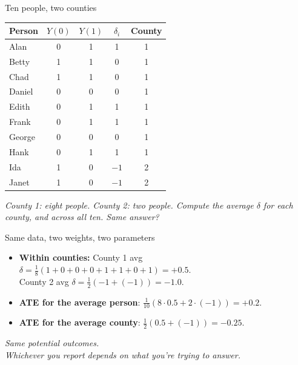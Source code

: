 \documentclass[aspectratio=169,11pt]{beamer}
\begin{document}
\begin{frame}{Ten people, two counties}
\vspace{0.1em}
\begin{center}
\footnotesize
\renewcommand{\arraystretch}{1.05}
\begin{tabular}{@{}l c c c c@{}}
\toprule
\textbf{Person} & $Y(0)$ & $Y(1)$ & $\delta_i$ & \textbf{County} \\
\midrule
\rowcolor{remixgreenlight}Alan    & 0 & 1 &  1 & 1 \\
\rowcolor{remixgreenlight}Betty   & 1 & 1 &  0 & 1 \\
\rowcolor{remixgreenlight}Chad    & 1 & 1 &  0 & 1 \\
\rowcolor{remixgreenlight}Daniel  & 0 & 0 &  0 & 1 \\
\rowcolor{remixgreenlight}Edith   & 0 & 1 &  1 & 1 \\
\rowcolor{remixgreenlight}Frank   & 0 & 1 &  1 & 1 \\
\rowcolor{remixgreenlight}George  & 0 & 0 &  0 & 1 \\
\rowcolor{remixgreenlight}Hank    & 0 & 1 &  1 & 1 \\
\midrule
\rowcolor{oceanlight}Ida   & 1 & 0 & $-1$ & 2 \\
\rowcolor{oceanlight}Janet & 1 & 0 & $-1$ & 2 \\
\bottomrule
\end{tabular}
\end{center}
\vspace{0.3em}
\begin{center}
\small\color{warmgray}\itshape
County 1: eight people. \;County 2: two people. \;Compute the average $\delta$ for each county, and across all ten. Same answer?
\end{center}
\end{frame}

\begin{frame}{Same data, two weights, two parameters}
\vspace{0.6em}
\begin{itemize}
  \item \textbf{Within counties:} County 1 avg $\delta = \tfrac{1}{8}(1{+}0{+}0{+}0{+}1{+}1{+}0{+}1) = \mathbf{+0.5}$. \\
        \hspace{1.7em} County 2 avg $\delta = \tfrac{1}{2}(-1{+}(-1)) = \mathbf{-1.0}$.
  \item \textbf{ATE for the average person}: $\tfrac{1}{10}(8\cdot 0.5 + 2\cdot(-1)) = \mathbf{+0.2}$.
  \item \textbf{ATE for the average county}: $\tfrac{1}{2}(0.5 + (-1)) = \mathbf{-0.25}$.
\end{itemize}
\vspace{0.7em}
\begin{center}
\small\color{warmgray}\itshape Same potential outcomes.  \\ Whichever you report depends on what you're trying to answer.
\end{center}
\end{frame}
\end{document}
